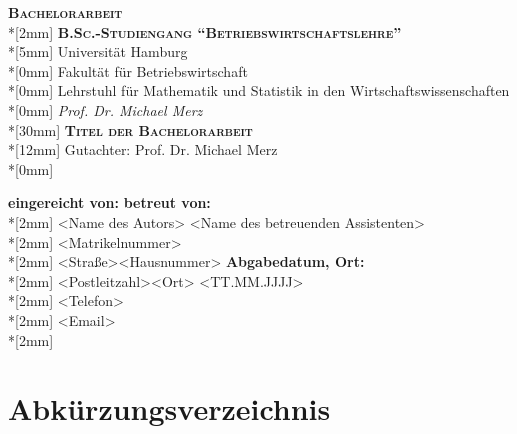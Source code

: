 ﻿\documentclass[a4paper,titlepage]{article}
\numberwithin{equation}{section} %
\begin{document}
\begin{titlepage}
\begin{center}                     
        {\Large\scshape \textbf{Bachelorarbeit}}\\*[2mm]
				{\Large\scshape \textbf{B.Sc.-Studiengang "`Betriebswirtschaftslehre"'}}\\*[5mm]
				{\large Universität Hamburg}\\*[0mm]
				{\large Fakultät für Betriebswirtschaft}\\*[0mm]
				{\large Lehrstuhl für Mathematik und Statistik in den Wirtschaftswissenschaften}\\*[0mm]
				{\large \emph{Prof. Dr. Michael Merz}}\\*[30mm]
        {\bf \LARGE\scshape Titel der Bachelorarbeit}\\*[12mm]
				{\large Gutachter: Prof. Dr. Michael Merz}\\*[0mm]
\end{center}  
\vspace{5cm}
\begin{tabbing}
       \textbf{eingereicht von:}		\hspace{6.5cm}\=			\textbf{betreut von:}\\*[2mm]
       <Name des Autors>								\> <Name des betreuenden Assistenten>\\*[2mm]		
       <Matrikelnummer>  \\*[2mm]
       <Straße><Hausnummer>										\> \textbf{Abgabedatum, Ort:} \\*[2mm]
       <Postleitzahl><Ort>		   							\> <TT.MM.JJJJ>   \\*[2mm]
       <Telefon> \\*[2mm]
       <Email> \\*[2mm]
\end{tabbing}
\end{titlepage}
\newpage


\setcounter{page}{2}

\tableofcontents
\newpage

\listoffigures
\newpage

\listoftables
\newpage

\section*{Abkürzungsverzeichnis}
\newpage
\end{document}
